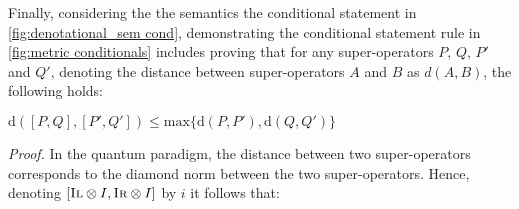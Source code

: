 \vspace{5pt}

Finally, considering the the semantics  the conditional statement  in \autoref{fig:denotational_sem cond}, demonstrating the conditional statement rule in \autoref{fig:metric conditionals} includes proving that for any super-operators $P$, $Q$, $P'$ and $Q'$,  denoting the distance between super-operators $A$ and $B$ as $d(A,B)$,  the following holds:
\begin{lemma} \label {lemma_max_otimes}
  $\text{d} ([P,Q],[P',Q']) \leq \text{max} \{\text{d} (P,P'),\text{d} (Q,Q')\}$
\end{lemma}
\vspace{10pt}
\textit {Proof.} 
In the quantum paradigm, the distance between two super-operators  corresponds to the diamond norm between the two super-operators. Hence, denoting $ [\textsc{Il} \otimes I, \textsc{Ir} \otimes I ]$ by $i$ it follows that:


